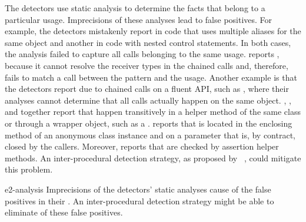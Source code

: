 \vspace{0.03in}
The detectors use static analysis to determine the facts that belong to a particular usage.
Imprecisions of these analyses lead to false positives.
For example, the detectors mistakenly report  in code that uses multiple aliases for the same object and another  in code with nested control statements.
In both cases, the analysis failed to capture all calls belonging to the same usage.
\GROUMiner reports , because it cannot resolve the receiver types in the chained calls and, therefore, fails to match a call between the pattern and the usage.
Another example is that the detectors report  due to chained calls on a fluent API, such as , where their analyses cannot determine that all calls actually happen on the same object.
\Jadet, \GROUMiner, and \DMMC together report  that happen transitively in a helper method of the same class or through a wrapper object, such as a .
\DMMC reports  that is located in the enclosing method of an anonymous class instance and  on a parameter that is, by contract, closed by the callers.
Moreover, \GROUMiner reports  that are checked by assertion helper methods.
An inter-procedural detection strategy, as proposed by \PRMiner~\cite{LZ05}, could mitigate this problem.

\begin{obs}{e2-analysis}
  Imprecisions of the detectors' static analyses cause  of the false positives in their .
  An inter-procedural detection strategy might be able to eliminate  of these false positives.
\end{obs}

